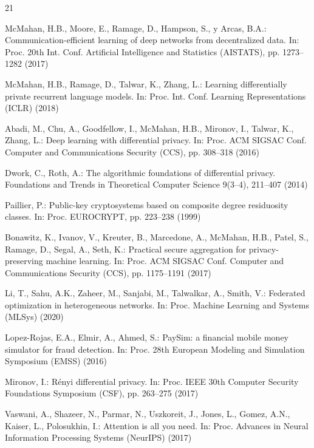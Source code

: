 \documentclass[12pt]{svproc}
\begin{document}
\begin{thebibliography}{21}

McMahan, H.B., Moore, E., Ramage, D., Hampson, S., y Arcas, B.A.:
Communication-efficient learning of deep networks from decentralized
data. In: Proc. 20th Int. Conf. Artificial Intelligence and Statistics
(AISTATS), pp. 1273--1282 (2017)

McMahan, H.B., Ramage, D., Talwar, K., Zhang, L.: Learning
differentially private recurrent language models. In: Proc. Int. Conf.
Learning Representations (ICLR) (2018)

Abadi, M., Chu, A., Goodfellow, I., McMahan, H.B., Mironov, I., Talwar,
K., Zhang, L.: Deep learning with differential privacy. In: Proc. ACM
SIGSAC Conf. Computer and Communications Security (CCS), pp. 308--318
(2016)

Dwork, C., Roth, A.: The algorithmic foundations of differential
privacy. Foundations and Trends in Theoretical Computer Science 9(3--4),
211--407 (2014)

Paillier, P.: Public-key cryptosystems based on composite degree
residuosity classes. In: Proc. EUROCRYPT, pp. 223--238 (1999)

Bonawitz, K., Ivanov, V., Kreuter, B., Marcedone, A., McMahan, H.B.,
Patel, S., Ramage, D., Segal, A., Seth, K.: Practical secure aggregation
for privacy-preserving machine learning. In: Proc. ACM SIGSAC Conf.
Computer and Communications Security (CCS), pp. 1175--1191 (2017)

Li, T., Sahu, A.K., Zaheer, M., Sanjabi, M., Talwalkar, A., Smith, V.:
Federated optimization in heterogeneous networks. In: Proc. Machine
Learning and Systems (MLSys) (2020)

Lopez-Rojas, E.A., Elmir, A., Ahmed, S.: PaySim: a financial mobile
money simulator for fraud detection. In: Proc. 28th European Modeling
and Simulation Symposium (EMSS) (2016)

Mironov, I.: R\'enyi differential privacy. In: Proc. IEEE 30th Computer
Security Foundations Symposium (CSF), pp. 263--275 (2017)

Vaswani, A., Shazeer, N., Parmar, N., Uszkoreit, J., Jones, L., Gomez,
A.N., Kaiser, L., Polosukhin, I.: Attention is all you need. In: Proc.
Advances in Neural Information Processing Systems (NeurIPS) (2017)


\end{thebibliography}
\end{document}

